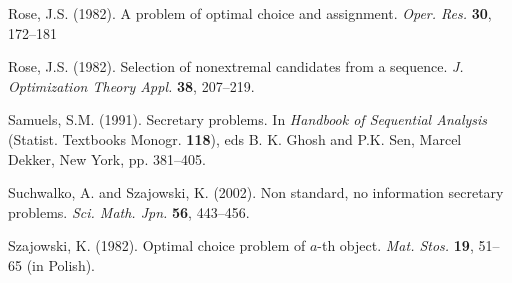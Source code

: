 \documentclass[12pt, A4paper, oneside]{article}
\theoremstyle{plain}
\numberwithin{equation}{section}
\begin{document}
\begin{thebibliography}{99}







{\sc Rose, J.S.} (1982).
A problem of optimal choice and assignment.
{\em Oper. Res.} {\bf 30}, 172--181

     {\sc Rose, J.S.} (1982).
     Selection of nonextremal candidates from a sequence.
     {\em J. Optimization Theory Appl.} {\bf 38}, 207--219.



    {\sc Samuels, S.M.} (1991).
    Secretary problems. In {\em Handbook of Sequential Analysis} (Statist. Textbooks Monogr. {\bf 118}), eds B. K. Ghosh and P.K. Sen, Marcel Dekker, New York, pp. 381--405.

    {\sc Suchwalko, A. and Szajowski, K.} (2002).
    Non standard, no information secretary problems.
    {\em Sci. Math. Jpn.} {\bf 56}, 443--456.

    {\sc Szajowski, K.} (1982).
    Optimal choice problem of $a$-th object.
    {\em Mat. Stos.} {\bf 19}, 51--65 (in Polish).


\end{thebibliography}
\end{document}
